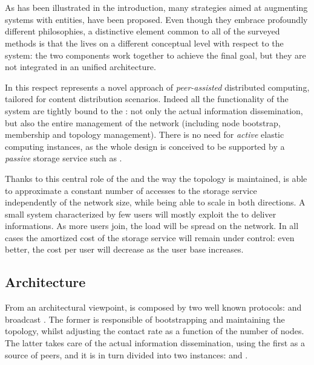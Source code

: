 \chapter{\cloudcast}

As has been illustrated in the introduction, many strategies aimed at
augmenting \ptop systems with \cloud entities, have been
proposed. Even though they embrace profoundly different philosophies,
a distinctive element common to all of the surveyed methods
is that the \cloud lives on a different conceptual level with respect
to the \ptop system: the two components work together to achieve the
final goal, but they are not integrated in an unified architecture.

In this respect \cloudcast \cite{Cloudcast} represents a novel approach
of \emph{peer-assisted} distributed computing, tailored for content
distribution scenarios. Indeed all the functionality of the system are
tightly bound to the \cloud: not only the actual information
dissemination, but also the entire management of the \ptop network
(including node bootstrap, membership and topology management). There is
no need for \emph{active} elastic computing instances, as the
whole design is conceived to be supported by a \emph{passive} storage
service such as \amazonsss.

Thanks to this central role of the \cloud and the way the topology is
maintained, \cloudcast is able to approximate a constant number of accesses
to the storage service independently of the network size, while
being able to scale in both directions. A small system characterized by
few users will mostly exploit the \cloud to deliver informations. As
more users join, the load will be spread on the
\ptop network. In all cases the amortized cost of the storage service
will remain under control: even better, the cost per user will
decrease as the user base increases.

\section{Architecture}
From an architectural viewpoint, \cloudcast is composed by two
well known \gossip protocols:
\peersampling \cite{GossipPeerSampling}
and \epidemic broadcast \cite{EpidemicAlgorithms}.
The former is responsible of bootstrapping and maintaining the topology,
whilst adjusting the \cloud contact rate as a function of the number
of nodes. The latter takes care of the actual information
dissemination, using the first as a source of peers, and it is in turn
divided into two instances: \antientropy and \rumormongering.


